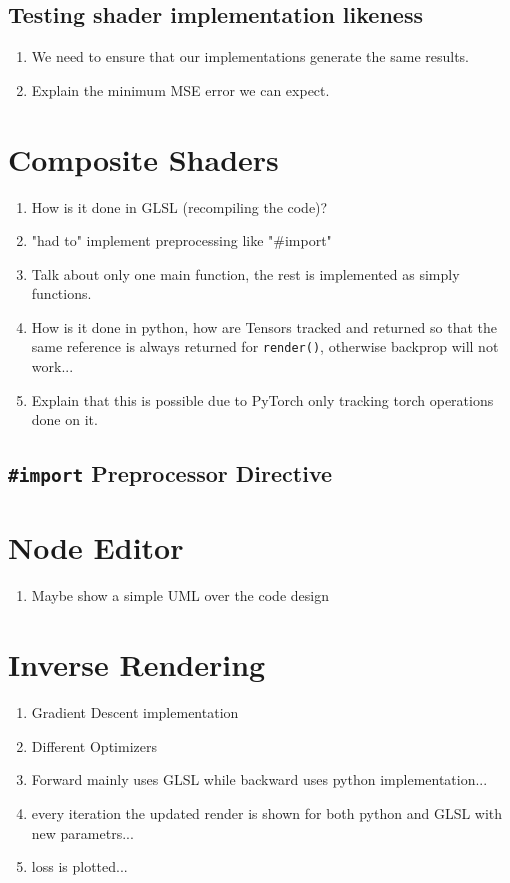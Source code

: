 \subsection{Testing shader implementation likeness}

\begin{enumerate}
    \item We need to ensure that our implementations generate the same results.
    \item Explain the minimum MSE error we can expect.
\end{enumerate}

\section{Composite Shaders}\label{sec:CompositeShaders}
\begin{enumerate}
    \item How is it done in GLSL (recompiling the code)?
    \item "had to" implement preprocessing like "\#import"
    \item Talk about only one main function, the rest is implemented as simply functions.
    \item How is it done in python, how are Tensors tracked and returned so that the same reference is always returned for \texttt{render()}, otherwise backprop will not work...
    \item Explain that this is possible due to PyTorch only tracking torch operations done on it.
\end{enumerate}

\subsection{\texttt{\#import} Preprocessor Directive}\label{sec:ImportPreprocessorDirective}




\section{Node Editor}

\begin{enumerate}
    \item Maybe show a simple UML over the code design
\end{enumerate}

\section{Inverse Rendering}

\begin{enumerate}
    \item Gradient Descent implementation
    \item Different Optimizers
    \item Forward mainly uses GLSL while backward uses python implementation...
    \item every iteration the updated render is shown for both python and GLSL with new parametrs...
    \item loss is plotted...
\end{enumerate}


